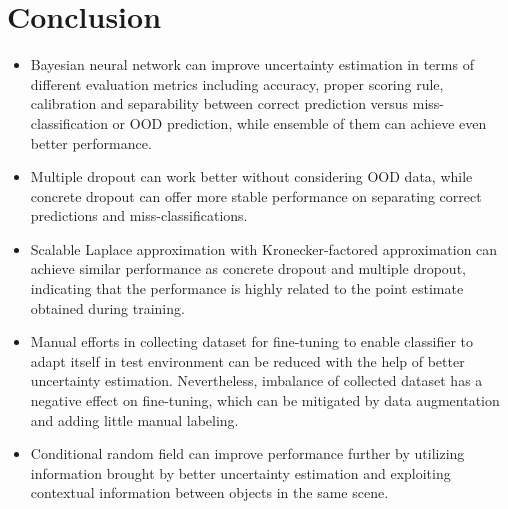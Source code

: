 \section{Conclusion}
\begin{itemize}
	\item Bayesian neural network can improve uncertainty estimation in terms of different evaluation metrics including accuracy, proper scoring rule, calibration and separability between correct prediction versus miss-classification or OOD prediction, while ensemble of them can achieve even better performance.
	
	\item Multiple dropout can work better without considering OOD data, while concrete dropout can offer more stable performance on separating correct predictions and miss-classifications.
	
	\item Scalable Laplace approximation with Kronecker-factored approximation can achieve similar performance as concrete dropout and multiple dropout, indicating that the performance is highly related to the point estimate obtained during training.
	
	\item Manual efforts in collecting dataset for fine-tuning to enable classifier to adapt itself in test environment can be reduced with the help of better uncertainty estimation. Nevertheless, imbalance of collected dataset has a negative effect on fine-tuning, which can be mitigated by data augmentation and adding little manual labeling.
	
	\item Conditional random field can improve performance further by utilizing information brought by better uncertainty estimation and exploiting contextual information between objects in the same scene.
	
\end{itemize}


